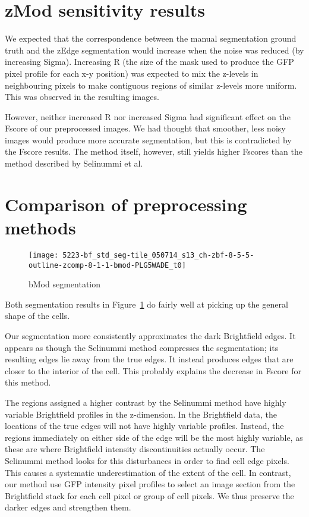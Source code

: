 \section{zMod sensitivity results}

We expected that the correspondence between the manual segmentation ground truth and the zEdge segmentation would increase when the noise was reduced (by increasing Sigma). Increasing R (the size of the mask used to produce the GFP pixel profile for each x-y position) was expected to mix the z-levels in neighbouring pixels to make contiguous regions of similar z-levels more uniform. This was observed in the resulting images.

However, neither increased R nor increased Sigma had significant effect on the Fscore of our preprocessed images. We had thought that smoother, less noisy images would produce more accurate segmentation, but this is contradicted by the Fscore results. The method itself, however, still yields higher Fscores than the method described by Selinummi et al.

\section{Comparison of preprocessing methods}

\begin{figure}[htbp!]
\centering
\texttt{[image: 5223-bf\_std\_seg-tile\_050714\_s13\_ch-zbf-8-5-5-outline-zcomp-8-1-1-bmod-PLG5WADE\_t0]}
\caption{bMod segmentation}
\label{fig:bmod_segmentation}
\end{figure}

Both segmentation results in Figure~\ref{fig:bmod_segmentation} do fairly well at picking up the general shape of the cells.

Our segmentation more consistently approximates the dark Brightfield edges. It appears as though the Selinummi method compresses the segmentation; its resulting edges lie away from the true edges. It instead produces edges that are closer to the interior of the cell. This probably explains the decrease in Fscore for this method.

The regions assigned a higher contrast by the Selinummi method have highly variable Brightfield profiles in the z-dimension. In the Brightfield data, the locations of the true edges will not have highly variable profiles. Instead, the regions immediately on either side of the edge will be the most highly variable, as these are where Brightfield intensity discontinuities actually occur. The Selinummi method looks for this disturbances in order to find cell edge pixels. This causes a systematic underestimation of the extent of the cell. In contrast, our method use GFP intensity pixel profiles to select an image section from the Brightfield stack for each cell pixel or group of cell pixels. We thus preserve the darker edges and strengthen them.
